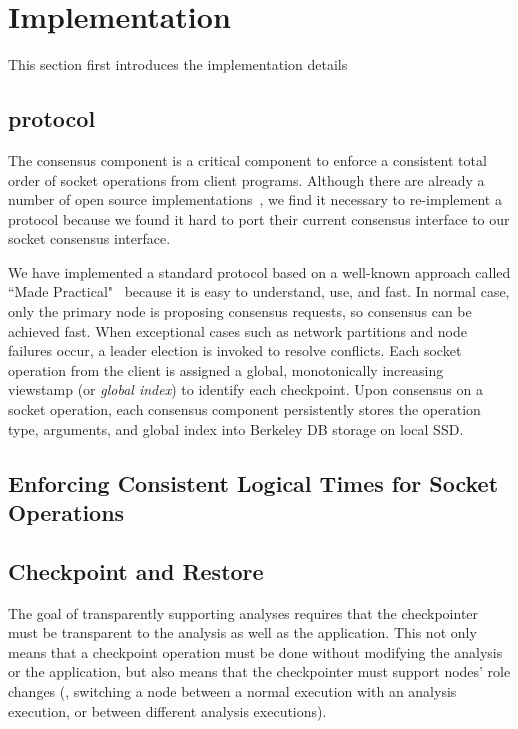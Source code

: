 \section{Implementation} \label{sec:impl}

This section first introduces the implementation details 

\subsection{\paxos protocol} \label{sec:paxos}
The \paxos consensus component is a critical component to enforce a consistent 
total order of socket operations from client programs. Although there are 
already a number of open source \paxos implementations~\cite{concoord, 
zookeeper, chubby:osdi, libpaxos}, we find it necessary to re-implement a 
\paxos protocol because \xxx we found it hard to port their current consensus 
interface to our socket consensus interface.

We have implemented a standard \paxos protocol based on a well-known approach 
called ``\paxos Made Practical"~\cite{paxos:practical} because it is easy to 
understand, use, and fast. In normal case, only the primary node is proposing 
consensus requests, so consensus can be achieved fast. When exceptional cases 
such as network partitions and node failures occur, a \paxos leader election is 
invoked to resolve conflicts. Each socket operation from the client is assigned 
a global, monotonically increasing viewstamp (or \emph{global index}) to 
identify each checkpoint. Upon consensus on a socket operation, each consensus 
component persistently stores the operation type, arguments, and global index 
into Berkeley DB storage on local SSD.

\subsection{Enforcing Consistent Logical Times for Socket Operations} 
\label{sec:timing}

\subsection{Checkpoint and Restore} \label{sec:checkpoint}

The goal of transparently supporting analyses requires that the checkpointer 
must be transparent to the analysis as well as the application. This not only 
means that a checkpoint operation must be done without modifying the analysis 
or the application, but also means that the checkpointer must support nodes' 
role changes (\eg, switching a node between a normal execution with an analysis 
execution, or between different analysis executions).

